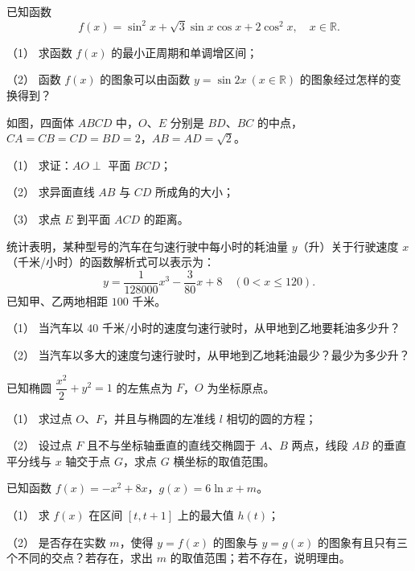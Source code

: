 \begin{question}
已知函数
\nopagebreak[4]
\[
f(x)=\sin^2 x+\sqrt{3}\sin x\cos x+2\cos^2 x,\quad x\in\mathbb{R}.
\]

（1） 求函数 $f(x)$ 的最小正周期和单调增区间；

（2） 函数 $f(x)$ 的图象可以由函数 $y=\sin 2x\ (x\in\mathbb{R})$ 的图象经过怎样的变换得到？

\Needspace{0.4\textheight}
\end{question}
\begin{question}
如图，四面体 $ABCD$ 中，$O$、$E$ 分别是 $BD$、$BC$ 的中点，$CA=CB=CD=BD=2$，$AB=AD=\sqrt{2}$。

（1） 求证：$AO\perp$ 平面 $BCD$；

（2） 求异面直线 $AB$ 与 $CD$ 所成角的大小；

（3） 求点 $E$ 到平面 $ACD$ 的距离。
\nopagebreak[4]
\begin{center}\end{center}
\nopagebreak[4]
\end{question}
\begin{question}
统计表明，某种型号的汽车在匀速行驶中每小时的耗油量 $y$（升）关于行驶速度 $x$（千米/小时）的函数解析式可以表示为：
\nopagebreak[4]
\[
y=\frac{1}{128000}x^3-\frac{3}{80}x+8\quad(0<x\le120).
\]
已知甲、乙两地相距 $100$ 千米。

（1） 当汽车以 $40$ 千米/小时的速度匀速行驶时，从甲地到乙地要耗油多少升？

（2） 当汽车以多大的速度匀速行驶时，从甲地到乙地耗油最少？最少为多少升？

\Needspace{0.4\textheight}
\end{question}
\begin{question}
已知椭圆 $\dfrac{x^2}{2}+y^2=1$ 的左焦点为 $F$，$O$ 为坐标原点。

（1） 求过点 $O$、$F$，并且与椭圆的左准线 $l$ 相切的圆的方程；

（2） 设过点 $F$ 且不与坐标轴垂直的直线交椭圆于 $A$、$B$ 两点，线段 $AB$ 的垂直平分线与 $x$ 轴交于点 $G$，求点 $G$ 横坐标的取值范围。
\nopagebreak[4]
\begin{center}\end{center}
\nopagebreak[4]
\end{question}
\begin{question}
已知函数 $f(x)=-x^2+8x$，$g(x)=6\ln x+m$。

（1） 求 $f(x)$ 在区间 $[t,t+1]$ 上的最大值 $h(t)$；

（2） 是否存在实数 $m$，使得 $y=f(x)$ 的图象与 $y=g(x)$ 的图象有且只有三个不同的交点？若存在，求出 $m$ 的取值范围；若不存在，说明理由。

\end{question}

